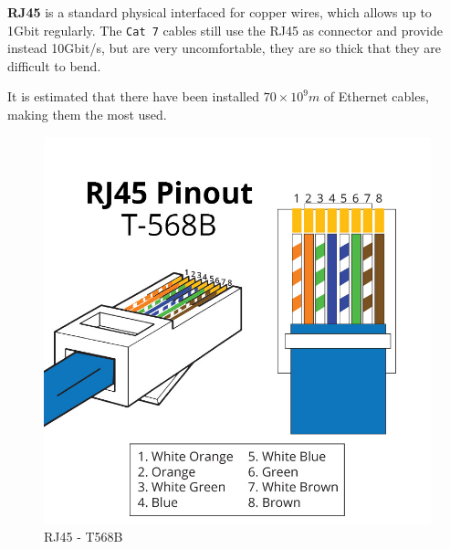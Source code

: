 \begin{paracol}{2}
   \colfill
   \textbf{RJ45} is a standard physical interfaced for copper wires, which allows up to 1Gbit regularly.
   The \texttt{Cat 7} cables still use the RJ45 as connector and provide instead 10Gbit/s, but are very uncomfortable, they are so thick that they are difficult to bend.
   
   It is estimated that there have been installed $70 \times 10^9m$ of Ethernet cables, making them the most used.
   \colfill
   \switchcolumn

   \begin{figure}[htbp]
      \centering
      \includegraphics{images/RJ45_T568B.jpg}
      \caption{RJ45 - T568B}
      \label{fig:RJ45_T568B}
   \end{figure}
\end{paracol}

